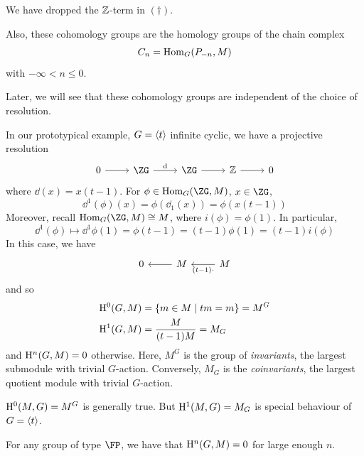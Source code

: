 \documentclass{article}
\begin{document}
\begin{remark}
    We have dropped the \(\mathbb{Z}\)-term in \((\dagger)\).

    Also, these cohomology groups are the homology groups of the chain complex
    \[C_n = \operatorname{Hom}_G(P_{-n}, M)\]
    with \(-\infty < n \le 0\).
\end{remark}

Later, we will see that these cohomology groups are independent of the choice of resolution. 

\begin{example}
    In our prototypical example, \(G = \left\langle t \right\rangle\) infinite cyclic, we have a projective resolution
\[\begin{tikzcd}
	0 & \ZG & \ZG & \Z & 0
	\arrow[from=1-1, to=1-2]
	\arrow["\dd", from=1-2, to=1-3]
	\arrow[from=1-3, to=1-4]
	\arrow[from=1-4, to=1-5]
\end{tikzcd}\]
    where \(\dd(x) = x(t-1)\). For \(\phi \in \Hom_G(\ZG, M)\), \(x \in \ZG\),
    \[\dd^1(\phi)(x) = \phi(\dd_1(x)) = \phi(x(t-1))\]
    Moreover, recall \(\Hom_G(\ZG, M) \cong M\), where \(i(\phi) = \phi(1)\). In particular,
    \[\dd^1(\phi) \mapsto \dd^1\phi(1) = \phi(t - 1) = (t - 1)\phi(1) = (t - 1)i(\phi)\]
    In this case, we have
\[\begin{tikzcd}
	0 & M & M
	\arrow["{(t-1)\cdot}", from=1-3, to=1-2]
	\arrow[from=1-2, to=1-1]
\end{tikzcd}\]
    and so
    \begin{align*}
        \mathrm{H}^0(G, M) &= \{m \in M \mid tm = m\} = M^G \\
        \mathrm{H}^1(G, M) &= \frac{M}{(t-1)M} = M_G
    \end{align*}
    and \(\mathrm{H}^n(G, M) = 0\) otherwise. Here, \(M^G\) is the group of \emph{invariants}, the largest submodule with trivial \(G\)-action. Conversely, \(M_G\) is the \emph{coinvariants}, the largest quotient module with trivial \(G\)-action.
\end{example}

\begin{remark}
    \(\mathrm{H}^0(M, G) = M^G\) is generally true. But \(\mathrm{H}^1(M, G) = M_G\) is special behaviour of \(G = \left\langle t \right\rangle\).

    For any group of type \(\FP\), we have that \(\mathrm{H}^n(G, M) = 0\) for large enough \(n\).
\end{remark}
\end{document}

